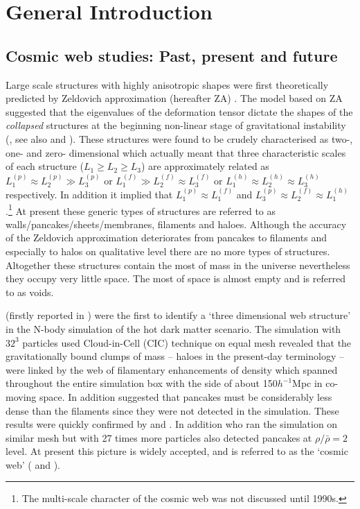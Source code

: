 
\chapter{General Introduction}

\section{Cosmic web studies: Past, present and future}

Large scale structures with  highly anisotropic shapes were first theoretically predicted by Zeldovich approximation (hereafter ZA) \citep{Zeldovich1970}. The model based on ZA suggested that the eigenvalues of the deformation tensor dictate the shapes of the {\it collapsed} structures at the beginning non-linear stage of gravitational instability (\citealt{Arnold1982}, see also \citealt{Shandarin1989} and \citealt{Hidding2014}). These structures were found to be crudely  characterised as two-, one- and zero- dimensional  which actually meant that three characteristic scales of each structure ($L_1\ge L_2\ge L_3$) are approximately related as  $L_1^{(p)} \approx L_2^{(p)} \gg L_3^{(p)}$ or $L_1^{(f)} \gg L_2^{(f)} \approx L_3^{(f)}$ or $L_1^{(h)} \approx L_2^{(h)}  \approx L_3^{(h)} $ respectively.  In addition it implied that $L_1^{(p)} \approx L_1^{(f)}$ and $L_3^{(p)} \approx L_2^{(f)} \approx L_1^{(h)}$.\footnote{The multi-scale character of the cosmic web was not discussed until 1990s.} At present these generic types of structures are referred to as  walls/pancakes/sheets/membranes, filaments and haloes. Although the accuracy of the Zeldovich approximation deteriorates from pancakes to  filaments and especially to halos on qualitative level  there are no more types of  structures. Altogether these structures contain the most of mass in the universe nevertheless they occupy  very little space. The most of space is almost empty  and is referred to as voids.

\cite{Klypin1983a} (firstly reported  in \citealt{Shandarin1983}) were the first to identify a `three dimensional web structure' in the N-body simulation of the hot dark matter scenario. The simulation with $32^3$ particles used Cloud-in-Cell (CIC) technique on equal mesh revealed  that the gravitationally bound clumps of mass -- haloes in the present-day terminology --  were linked by the web of filamentary enhancements of density which spanned throughout the entire simulation box with the side of about 150$h^{-1}$Mpc in co-moving space. In addition \cite{Klypin1983a}  suggested that pancakes must be considerably less dense than the filaments since they were not detected in the simulation. These  results were quickly confirmed by \cite{Centrella1983} and \cite{Frenk1983}. In addition \cite{Centrella1983} who ran the simulation on similar mesh but with 27 times more particles also detected pancakes at $\rho/\bar{\rho} = 2$ level. At present this picture is widely accepted, and is referred to as the `cosmic web' (\citealt{Bond1996} and \citealt{Weygaert2008c}). 

